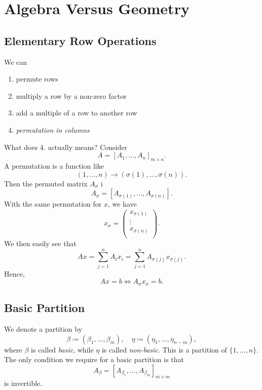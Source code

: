 \section{Algebra Versus Geometry}
\subsection{Elementary Row Operations}
We can
\begin{enumerate}
	\item permute rows
	\item multiply a row by a non-zero factor
	\item add a multiple of a row to another row
	\item \emph{permutation in columns}
\end{enumerate}
What does 4. actually means?
Consider
\[
	A = \left[ A_1, \ldots , A_n \right]_{m\times n} .
\]
A permutation is a function like
\[
	(1, \ldots , n) \to (\sigma(1), \ldots , \sigma(n)).
\]
Then the permuted matrix \(A_{\sigma}\) i
\[
	A_{\sigma} = \left[ A_{\sigma(1)}, \ldots , A_{\sigma(n)} \right].
\]
With the same permutation for \(x\), we have
\[
	x_{\sigma} = \begin{pmatrix}
		x_{\sigma(1)} \\
		\vdots        \\
		x_{\sigma(n)} \\
	\end{pmatrix}.
\]
We then easily see that
\[
	Ax = \sum\limits_{j=1}^{n} A_i x_i = \sum\limits_{j=1}^{n} A_{\sigma(j)}x_{\sigma(j)}.
\]
Hence,
\[
	Ax = b \iff A_{\sigma} x_{\sigma} = b.
\]

\subsection{Basic Partition}
We denote a partition by
\[
	\beta \coloneqq (\beta_1, \ldots , \beta_m),\quad \eta \coloneqq (\eta_1, \ldots , \eta_{n-m}),
\]
where \(\beta\) is called \emph{basic}, while \(\eta\) is called \emph{non-basic}. This is a partition of \(\{1, \ldots , n\}\).
The only condition we require for a basic partition is that
\[
	A_{\beta} = \left[ A_{\beta_1}, \ldots , A_{\beta_m} \right]_{m\times m}
\]
is invertible.

